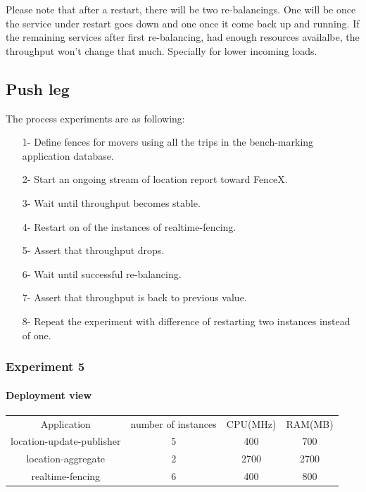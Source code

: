 \documentclass[a4]{report}
\begin{document}
    Please note that after a restart, there will be two re-balancings.
    One will be once the service under restart goes down and one once it come back up and running.
    If the remaining services after first re-balancing, had enough resources availalbe, the throughput won't change
    that much.
    Specially for lower incoming loads.

    \subsection{Push leg}
    The process experiments are as following:
    \begin{itemize}
        \item[1-] Define fences for movers using all the trips in the bench-marking application database.
        \item[2-] Start an ongoing stream of location report toward FenceX.
        \item[3-] Wait until throughput becomes stable.
        \item[4-] Restart on of the instances of realtime-fencing.
        \item[5-] Assert that throughput drops.
        \item[6-] Wait until successful re-balancing.
        \item[7-] Assert that throughput is back to previous value.
        \item[8-] Repeat the experiment with difference of restarting two instances instead of one.
    \end{itemize}

    \subsubsection{Experiment 5}

    \paragraph{Deployment view}
    \begin{center}
        \begin{tabular}{ c c c c }
            Application               & number of instances & CPU(MHz) & RAM(MB) \\
            location-update-publisher & 5                   & 400      & 700     \\
            location-aggregate        & 2                   & 2700     & 2700    \\
            realtime-fencing          & 6                   & 400      & 800     \\
        \end{tabular}
    \end{center}
\end{document}
